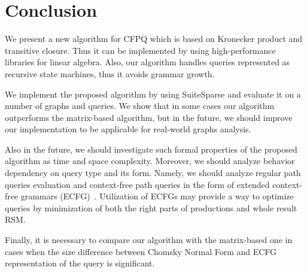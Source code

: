 \section{Conclusion}

We present a new algorithm for CFPQ which is based on Kronecker product and transitive closure.
Thus it can be implemented by using high-performance libraries for linear algebra. Also, our algorithm handles queries represented as recursive state machines, thus it avoids grammar growth.

We implement the proposed algorithm by using SuiteSparse and evaluate it on a number of graphs and queries.
We show that in some cases our algorithm outperforms the matrix-based algorithm, but in the future, we should improve our implementation to be applicable for real-world graphs analysis. 

Also in the future, we should investigate such formal properties of the proposed algorithm as time and space complexity.
Moreover, we should analyze behavior dependency on query type and its form. Namely, we should analyze regular path queries evaluation and context-free path queries in the form of extended context-free grammars (ECFG)~\cite{10.1007/978-3-642-00982-2_35}.
Utilization of ECFGs may provide a way to optimize queries by minimization of both the right parts of productions and whole result RSM.

Finally, it is necessary to compare our algorithm with the matrix-based one in cases when the size difference between Chomsky Normal Form and ECFG representation of the query is significant.